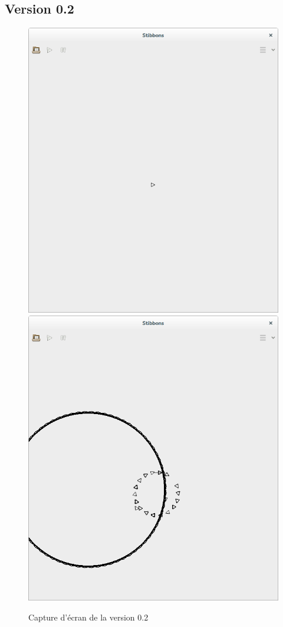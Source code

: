 \subsection{Version 0.2}

\begin{figure}[h]
\centering
\includegraphics[scale=0.25]{doc/report/screenshot/stibbons-0-2-1.png}
\includegraphics[scale=0.25]{doc/report/screenshot/stibbons-0-2-2.png}
\caption{\label{screenshot-0.2} Capture d'écran de la version 0.2}
\end{figure}

